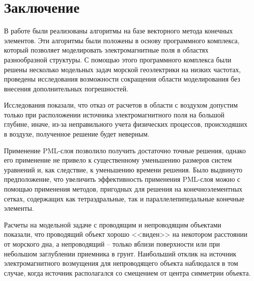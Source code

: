 \documentclass[a4paper,14pt]{article}
\begin{document}

\clearpage
{}
\section*{Заключение}
В работе были реализованы алгоритмы на базе векторного метода конечных элементов. Эти алгоритмы были положены в основу программного комплекса, который позволяет моделировать электромагнитные поля в областях разнообразной структуры. С помощью этого программного комплекса были решены несколько модельных задач морской геоэлектрики на низких частотах, проведены исследования возможности сокращения области моделирования без внесения дополнительных погрешностей.

Исследования показали, что отказ от расчетов в области с воздухом допустим только при расположении источника электромагнитного поля на большой глубине, иначе, из-за неправильного учета физических процессов, происходяших в воздухе, полученное решение будет неверным.

Применение PML-слоя позволило получить достаточно точные решения, однако его применение не привело к существенному уменьшению размеров систем уравнений и, как следствие, к уменьшению времени решения. Было выдвинуто предположение, что увеличить эффективность применения PML-слоя можно с помощью применения методов, пригодных для решения на конечноэлементных сетках, содержащих как тетраэдральные, так и параллелепипедальные конечные элементы.

Расчеты на модельной задаче с проводящим и непроводящим объектами показали, что проводящий объект хорошо <<виден>> на некотором расстоянии от морского дна, а непроводящий -- только вблизи поверхности или при небольшом заглублении приемника в грунт. Наибольший отклик на источник электромагнитного возмущения для непроводящего объекта наблюдался в том случае, когда источник располагался со смещением от центра симметрии объекта.


\clearpage
{}

\end{document}
